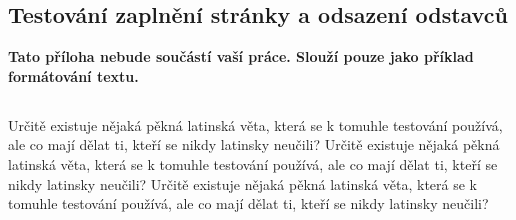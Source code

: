 \documentclass[11pt,twoside,a4paper]{book}
\begin{document}
\begin{itemize}

%




%
{
\def\CS{$\cal C\kern-0.1667em\lower.5ex\hbox{$\cal S$}\kern-0.075em $}

}

%

\appendix

\chapter{Testování zaplnění stránky a odsazení odstavců}
\textbf{\large Tato příloha nebude součástí vaší práce. 
Slouží pouze jako příklad formátování textu.}

\section*{}
Určitě existuje nějaká pěkná latinská věta, která se k tomuhle testování používá, ale co mají dělat ti, kteří se nikdy latinsky neučili? Určitě existuje nějaká pěkná latinská věta, která se k tomuhle testování používá, ale co mají dělat ti, kteří se nikdy latinsky neučili? Určitě existuje nějaká pěkná latinská věta, která se k tomuhle testování používá, ale co mají dělat ti, kteří se nikdy latinsky neučili?


\end{itemize}
\end{document}
